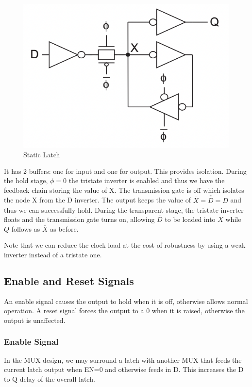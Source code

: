 \documentclass[11pt]{report}
\begin{document}
\begin{figure}
	\centering
	\includegraphics[scale=0.5]{images/static-latch.png}
	\caption{Static Latch}\label{fig:static-latch}
\end{figure}

It has 2 buffers: one for input and one for output. This provides isolation. During the hold stage, $\phi=0$ the tristate inverter is enabled and thus we have the feedback chain storing the value of X. The transmission gate is off which isolates the node X from the D inverter. The output keeps the value of $\overline{X} = \overline{\overline{D}} = D$ and thus we can successfully hold. During the transparent stage, the tristate inverter floats and the transmission gate turns on, allowing $\overline{D}$ to be loaded into $X$ while $Q$ follows as $\overline{X}$ as before.

Note that we can reduce the clock load at the cost of robustness by using a weak inverter instead of a tristate one.

\subsection{Enable and Reset Signals}
An enable signal causes the output to hold when it is off, otherwise allows normal operation. A reset signal forces the output to a 0 when it is raised, otherwise the output is unaffected.

\subsubsection{Enable Signal}
In the MUX design, we may surround a latch with another MUX that feeds the current latch output when EN=0 and otherwise feeds in D. This increases the D to Q delay of the overall latch.
\end{document}
